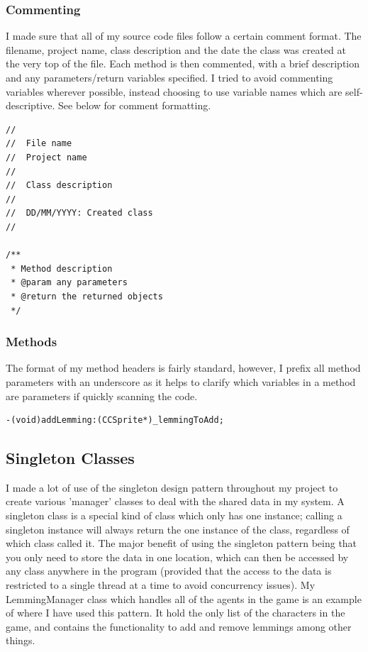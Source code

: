 \documentclass[a4paper,oneside]{report}
\begin{document}
\subsubsection{Commenting}

I made sure that all of my source code files follow a certain comment format. The filename, project name, class description and the date the class was created at the very top of the file. Each method is then commented, with a brief description and any parameters/return variables specified. I tried to avoid commenting variables wherever possible, instead choosing to use variable names which are self-descriptive. See below for comment formatting.

\begin{lstlisting}
//
//  File name
//  Project name
//
//  Class description
//
//  DD/MM/YYYY: Created class
//

/**
 * Method description
 * @param any parameters
 * @return the returned objects
 */\end{lstlisting}

\subsubsection{Methods}

The format of my method headers is fairly standard, however, I prefix all method parameters with an underscore as it helps to clarify which variables in a method are parameters if quickly scanning the code.

\begin{lstlisting}
-(void)addLemming:(CCSprite*)_lemmingToAdd;
\end{lstlisting}


\subsection{Singleton Classes} 

I made a lot of use of the singleton design pattern throughout my project to create various 'manager' classes to deal with the shared data in my system. A singleton class is a special kind of class which only has one instance; calling a singleton instance will always return the one instance of the class, regardless of which class called it. The major benefit of using the singleton pattern being that you only need to store the data in one location, which can then be accessed by any class anywhere in the program (provided that the access to the data is restricted to a single thread at a time to avoid concurrency issues). My LemmingManager class which handles all of the agents in the game is an example of where I have used this pattern. It hold the only list of the characters in the game, and contains the functionality to add and remove lemmings among other things.
\end{document}
